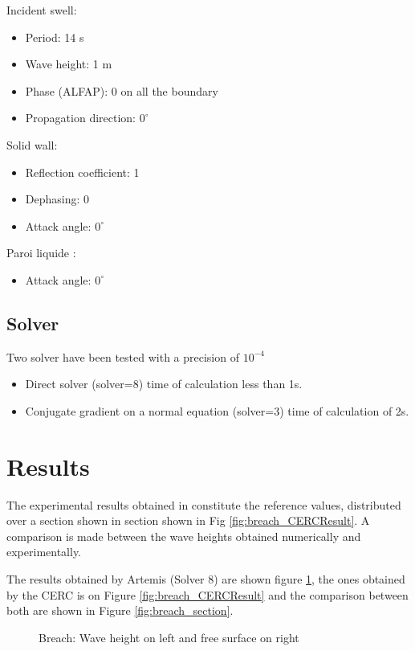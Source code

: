 Incident swell:
\begin{itemize}
\item Period: 14 s
\item Wave height: 1 m
\item Phase (ALFAP): 0 on all the boundary
\item Propagation direction: $0^\circ$
\end{itemize}
Solid wall:
\begin{itemize}
\item Reflection coefficient: 1
\item Dephasing: 0
\item Attack angle: $0^\circ$
\end{itemize}
Paroi liquide :
\begin{itemize}
\item Attack angle: $0^\circ$
\end{itemize}
\subsection{Solver}
Two solver have been tested with a precision of $10^{-4}$
\begin{itemize}
\item Direct solver (solver=8) time of calculation less than 1s. 
\item Conjugate gradient on a normal equation (solver=3) time of calculation of 2s.
  \end{itemize}
\section{Results}
The experimental results obtained in \cite{CERC1984} constitute the reference values, distributed over a section shown in
section shown in Fig \ref{fig:breach_CERCResult}. A comparison is made between the wave heights obtained
numerically and experimentally.

The results obtained by Artemis (Solver 8) are shown figure \ref{fig:breach_results}, the ones obtained by the CERC is on Figure
\ref{fig:breach_CERCResult} and the comparison between both are shown in Figure \ref{fig:breach_section}. 
\begin{figure}[h]
\begin{center}
\end{center}
\caption{Breach: Wave height on left and free surface on right}
\label{fig:breach_results}
\end{figure}



